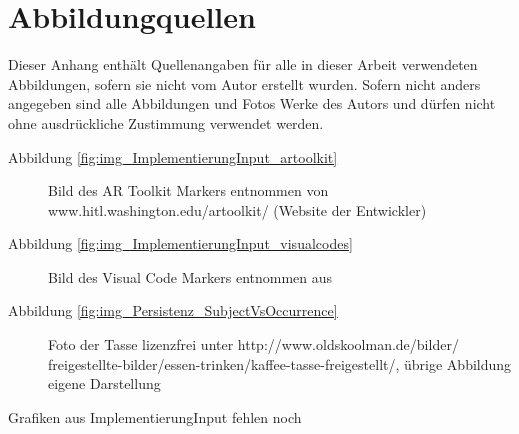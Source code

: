 \chapter*{Abbildungquellen}

Dieser Anhang enthält Quellenangaben für alle in dieser Arbeit verwendeten Abbildungen, sofern sie nicht vom Autor erstellt wurden. Sofern nicht anders angegeben sind alle Abbildungen und Fotos Werke des Autors und dürfen nicht ohne ausdrückliche Zustimmung verwendet werden.

\begin{description}
 \item[Abbildung \ref{fig:img_ImplementierungInput_artoolkit}] Bild des AR Toolkit Markers entnommen von www.hitl.washington.edu/artoolkit/ (Website der Entwickler)
 \end{description}

\begin{description}
 \item[Abbildung \ref{fig:img_ImplementierungInput_visualcodes}] Bild des Visual Code Markers entnommen aus \citet{Rohs04}
 \end{description}

\begin{description}
 \item[Abbildung \ref{fig:img_Persistenz_SubjectVsOccurrence}] Foto der Tasse lizenzfrei unter http://www.oldskoolman.de/bilder/\\freigestellte-bilder/essen-trinken/kaffee-tasse-freigestellt/, übrige Abbildung eigene Darstellung
 \end{description}

Grafiken aus ImplementierungInput fehlen noch